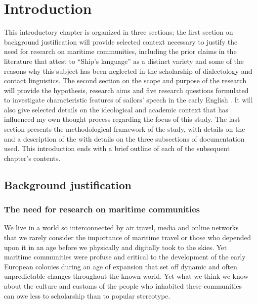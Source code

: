 \chapter{Introduction}

This introductory chapter is organized in three sections; the first section on background justification will provide selected context necessary to justify the need for research on maritime communities, including the prior claims in the literature that attest to “Ship’s language” as a distinct variety and some of the reasons why this subject has been neglected in the scholarship of dialectology and contact linguistics. The second section on the scope and purpose of the research will provide the hypothesis, research aims and five research questions formulated to investigate characteristic features of sailors’ speech in the early English . It will also give selected details on the ideological and academic context that has influenced my own thought process regarding the focus of this study. The last section presents the methodological framework of the study, with details on the  and a description of the  with details on the three subsections of documentation used. This introduction ends with a brief outline of each of the subsequent chapter’s contents.



\section{{Background justification} }\label{sec:1.1}



\subsection{{The need for research on maritime communities}}\label{sec:1.1.1}



We live in a world so interconnected by air travel, media and online networks that we rarely consider the importance of maritime travel or those who depended upon it in an age before we physically and digitally took to the skies. Yet maritime communities were profuse and critical to the development of the early European colonies during an age of expansion that set off dynamic and often unpredictable changes throughout the known world. Yet what we think we know about the culture and customs of the people who inhabited these communities can owe less to scholarship than to popular stereotype. 




